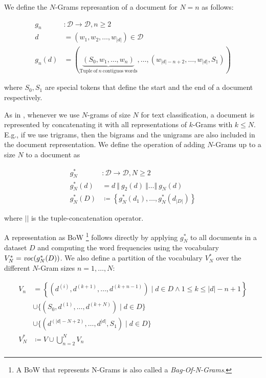We define the $N$-Grams represantion of a document for $N=n$ as follows:

\begin{equation*}
\begin{split}
g_n &:  \mathcal{D} \to \mathcal{D}, n \geq 2 \\
d &= (w_1,w_2,\ldots,w_{|d|}) \in \mathcal{D} \\
g_n(d) &=  (\underbrace{(S_0,w_1, \ldots,
w_n)}_{\mathrm{Tuple~of}~n\mathrm{~contiguos~words}}, \ldots,
(w_{|d|-n+2},\ldots,w_{|d|},S_1))
\end{split}
\end{equation*}

where $S_0, S_1$ are special tokens that define the start
and the end of a document respectively.

As in \cite{wang2012baselines, furnkranz1998study}, whenever we use $N$-grams of
size $N$ for text classification, a document is represented by concatenating it
with all representations of $k$-Grams with $k \leq N$. E.g., if we use trigrams, then the bigrams and the
unigrams are also included in the document representation. 
We define the operation of adding $N$-Grams up to a size $N$ to a
document as

\begin{equation*}
\begin{split}
g_N^* &: \mathcal{D} \to \mathcal{D}, N \geq 2 \\
g_N^*(d) &= d~\Vert~g_2(d)~\Vert \ldots \Vert~g_N(d) \\
g_N^*(D) &\coloneqq \left\{g_N^*(d_1),\ldots,g_N^*(d_{|D|})\right\}
\end{split}
\end{equation*}

where $||$ is the tuple-concatenation operator.

A representation as BoW \footnote{A BoW that represents N-Grams is also called a
\emph{Bag-Of-N-Grams}. } follows directly by applying $g_N^*$ to all documents
in a dataset $D$ and computing the word frequencies using the vocabulary
$V_N^* = \mathit{voc}(g_N^*(D))$. We also define a partition of the vocabulary
$V_N^*$ over the different $N$-Gram sizes $n=1,\ldots,N$:

\begin{equation*}
\begin{split}
V_n &=  \left \{(d^{(i)},
d^{(k+1)},\ldots,d^{(k+n-1)}) \mid d \in D \wedge 1 \leq k \leq |d|-n+1
\right\} \\
& \cup \{ (S_0,d^{(1)},\ldots,d^{(k+N)})  \mid d \in D \} \\
& \cup \{ (d^{(|d|-N+2)},\ldots,d^{|d|},S_1) \mid d \in D\} \\
V_N^* &\coloneqq V \cup \bigcup\limits_{n=2}^N  V_n \\
\end{split}
\end{equation*}

